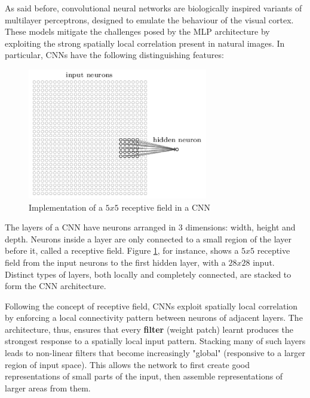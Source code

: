 As said before, convolutional neural networks are biologically inspired variants of multilayer perceptrons, designed to emulate the behaviour of the visual cortex. These models mitigate the challenges posed by the \ac{MLP} architecture by exploiting the strong spatially local correlation present in natural images.
In particular, \acsp{CNN} have the following distinguishing features:

\begin{description}
	
	\begin{figure}
		\centering
		\includegraphics[width=0.7\textwidth]{Images/receptive_field}
		\caption{Implementation of a $5x5$ receptive field in a \acs{CNN}}\label{fig:receptive_field}
	\end{figure}
	
	\item[3D volumes of neurons] The layers of a \acs{CNN} have neurons arranged in 3 dimensions: width, height and depth. Neurons inside a layer are only connected to a small region of the layer before it, called a receptive field. Figure \ref{fig:receptive_field}, for instance, shows a $5x5$ receptive field from the input neurons to the first hidden layer, with a $28x28$ input. Distinct types of layers, both locally and completely connected, are stacked to form the \acs{CNN} architecture.
	
	\item[Local connectivity] Following the concept of receptive field, \acsp{CNN} exploit spatially local correlation by enforcing a local connectivity pattern between neurons of adjacent layers. The architecture, thus, ensures that every \textbf{filter} (\ie weight patch) learnt produces the strongest response to a spatially local input pattern. Stacking many of such layers leads to non-linear filters that become increasingly "global" (\ie responsive to a larger region of input space). This allows the network to first create good representations of small parts of the input, then assemble representations of larger areas from them.
	

\end{description}
